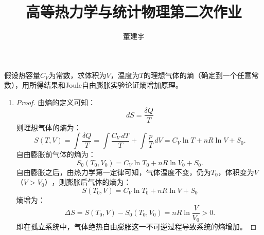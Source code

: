 \documentclass[reqno,a4paper,12pt]{amsart}
\title{高等热力学与统计物理第二次作业}
\author{董建宇}
\begin{document}
\maketitle

\titleformat{\section}[hang]{\small}{\thesection}{0.8em}{}{}
\titleformat{\subsection}[hang]{\small}{\thesubsection}{0.8em}{}{}

\section{}
	假设热容量$C_V$为常数，求体积为$V$，温度为$T$的理想气体的熵（确定到一个任意常数），用所得结果和Joule自由膨胀实验论证熵增加原理。 
	\begin{enumerate}
	\item 
	\begin{proof}
	由熵的定义可知：
	\[
		dS = \frac{\delta Q}{T}
	\]
	则理想气体的熵为：
	\[
		S(T, V) = \int \frac{\delta Q}{T} = \int \frac{C_V\,dT}{T} + \int \frac{p}{T}\,dV = C_V\ln T + nR \ln V + S_0.
	\]
	自由膨胀前气体的熵为：
	\[
		S_0(T_0, V_0) = C_V\ln T_0 + nR\ln V_0 + S_0.
	\]
	自由膨胀之后，由热力学第一定律可知，气体温度不变，仍为$T_0$，体积变为$V$$（V>V_0）$，则膨胀后气体的熵为：
	\[
		S(T_0, V) = C_V\ln T_0 + nR\ln V + S_0
	\]
	熵增为：
	\[
		\Delta S = S(T_0, V) - S_0(T_0, V_0) = nR\ln\frac{V}{V_0} > 0.
	\]
	即在孤立系统中，气体绝热自由膨胀这一不可逆过程导致系统的熵增加。
	\end{proof}
\end{enumerate}
\end{document}
